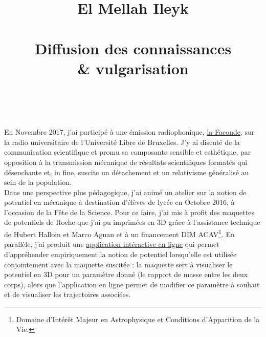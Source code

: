 \documentclass[paper=a4, fontsize=12pt,twoside]{scrartcl}
\title{	
\vspace*{-1cm}
\normalfont \normalsize 
El Mellah Ileyk \\ [25pt] %
\horrule{0.5pt} \\[0.4cm] %
\huge Diffusion des connaissances\\ \& vulgarisation \\ %
\horrule{2pt} \\[0.5cm] %
}
\date{} %
\begin{document}
\maketitle
\thispagestyle{empty}

\vspace*{-2cm}

\indent En Novembre 2017, j'ai particip\'e \`a une \'emission radiophonique, \href{https://www.mixcloud.com/faconde/faconde-s2e01-vulgarisation/}{la Faconde}, sur la radio universitaire de l'Universit\'e Libre de Bruxelles. J'y ai discut\'e de la communication scientifique et promu sa composante sensible et esth\'etique, par opposition \`a la transmission m\'ecanique de r\'esultats scientifiques format\'es qui d\'esenchante et, in fine, suscite un d\'etachement et un relativisme g\'en\'eralis\'e au sein de la population.\\

\indent Dans une perspective plus p\'edagogique, j'ai anim\'e un atelier sur la notion de potentiel en m\'ecanique \`a destination d'\'el\`eves de lyc\'ee en Octobre 2016, \`a l'occasion de la F\^ete de la Science. Pour ce faire, j'ai mis \`a profit des maquettes de potentiels de Roche que j'ai pu imprim\'ees en 3D gr\^ace \`a l'assistance technique de Hubert Halloin et Marco Agnan et \`a un financement DIM ACAV\footnote{Domaine d'Int\'er\^et Majeur en Astrophysique et Conditions d'Apparition de la Vie.}. En parall\`ele, j'ai produit une \href{http://demonstrations.wolfram.com/TrajectoryOfATestMassInARochePotential/}{application int\'eractive en ligne} qui permet d'appr\'ehender empiriquement la notion de potentiel lorsqu'elle est utilis\'ee conjointement avec la maquette suscit\'ee : la maquette sert \`a visualiser le potentiel en 3D pour un param\`etre donn\'e (le rapport de masse entre les deux corps), alors que l'application en ligne permet de modifier ce param\`etre \`a souhait et de visualiser les trajectoires associ\'ees.


\end{document}
